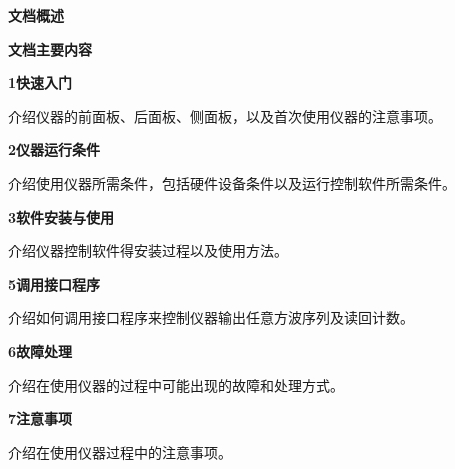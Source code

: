 \newpage
\noindent\xiaoer\textbf{文档概述}
\vspace{1.3cm}

\noindent\sanhao\textbf{文档主要内容}
\vspace{0.7cm}

\noindent\xiaosi\textbf{1\quad 快速入门}
\vspace{0.4cm}

\song 介绍仪器的前面板、后面板、侧面板，以及首次使用仪器的注意事项。
\vspace{0.9cm}

\noindent\xiaosi\textbf{2\quad 仪器运行条件}
\vspace{0.4cm}

\song 介绍使用仪器所需条件，包括硬件设备条件以及运行控制软件所需条件。
\vspace{0.9cm}

\noindent\xiaosi\textbf{3\quad 软件安装与使用}
\vspace{0.4cm}

\song 介绍仪器控制软件得安装过程以及使用方法。
\vspace{0.9cm}

\noindent\xiaosi\textbf{5\quad 调用接口程序}
\vspace{0.4cm}

\song 介绍如何调用接口程序来控制仪器输出任意方波序列及读回计数。
\vspace{0.9cm}

\noindent\xiaosi\textbf{6\quad 故障处理}
\vspace{0.4cm}

\song 介绍在使用仪器的过程中可能出现的故障和处理方式。
\vspace{0.9cm}

\noindent\xiaosi\textbf{7\quad 注意事项}
\vspace{0.4cm}

\song 介绍在使用仪器过程中的注意事项。

